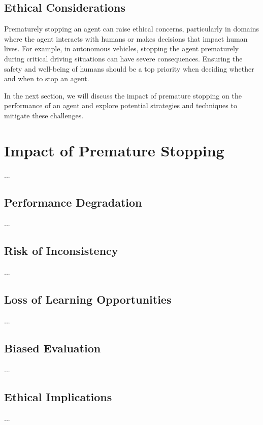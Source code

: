 \documentclass{article}
\begin{document}
\subsection{Ethical Considerations}

Prematurely stopping an agent can raise ethical concerns, particularly in domains where the agent interacts with humans or makes decisions that impact human lives. For example, in autonomous vehicles, stopping the agent prematurely during critical driving situations can have severe consequences. Ensuring the safety and well-being of humans should be a top priority when deciding whether and when to stop an agent.

In the next section, we will discuss the impact of premature stopping on the performance of an agent and explore potential strategies and techniques to mitigate these challenges.

\section{Impact of Premature Stopping}

...

\subsection{Performance Degradation}

...

\subsection{Risk of Inconsistency}

...

\subsection{Loss of Learning Opportunities}

...

\subsection{Biased Evaluation}

...

\subsection{Ethical Implications}

...
\end{document}
